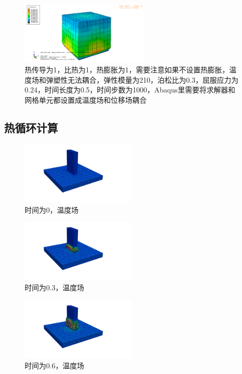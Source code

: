 \begin{figure}[!htbp]
  \centering
  \includegraphics[height=3cm]{fig/4/4.1.6/4.1.6.2.png}
  \caption{热传导为1，比热为1，热膨胀为1，需要注意如果不设置热膨胀，温度场和弹塑性无法耦合，弹性模量为210，泊松比为0.3，屈服应力为0.24，时间长度为0.5，时间步数为1000，Abaqus里需要将求解器和网格单元都设置成温度场和位移场耦合}
  \label{fig:4.1.4:4}
\end{figure}


\newpage
\subsection{热循环计算}

\begin{figure}[!htbp]
  \centering
  \includegraphics[height=3cm]{fig/4/4.1.6/4.1.6.11.png}
  \caption{时间为0，温度场}
  \label{fig:4.1.4:4}
\end{figure}

\begin{figure}[!htbp]
  \centering
  \includegraphics[height=3cm]{fig/4/4.1.6/4.1.6.12.png}
  \caption{时间为0.3，温度场}
  \label{fig:4.1.4:4}
\end{figure}

\begin{figure}[!htbp]
  \centering
  \includegraphics[height=3cm]{fig/4/4.1.6/4.1.6.13.png}
  \caption{时间为0.6，温度场}
  \label{fig:4.1.4:4}
\end{figure}

